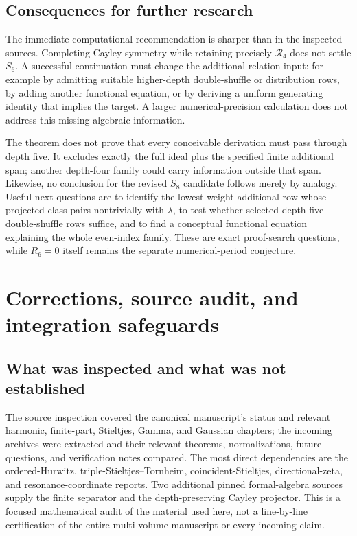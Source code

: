 \documentclass[11pt,a4paper]{article}
\numberwithin{equation}{section}
\theoremstyle{definition}
\theoremstyle{remark}
\begin{document}
\subsection{Consequences for further research}

The immediate computational recommendation is sharper than in the
inspected sources. Completing Cayley symmetry while retaining precisely
$\mathscr R_4$ does not settle $S_6$. A successful continuation must change
the additional relation input: for example by admitting suitable
higher-depth double-shuffle or distribution rows, by adding another
functional equation, or by deriving a uniform generating identity that
implies the target. A larger numerical-precision calculation does not
address this missing algebraic information.

The theorem does not prove that every conceivable derivation must pass
through depth five. It excludes exactly the full ideal plus the specified
finite additional span; another depth-four family could carry information
outside that span. Likewise, no conclusion for the revised $S_8$ candidate
follows merely by analogy. Useful next questions are to identify the
lowest-weight additional row whose projected class pairs nontrivially
with $\lambda$, to test whether selected depth-five double-shuffle rows
suffice, and to find a conceptual functional equation explaining the
whole even-index family. These are exact proof-search questions, while
$R_6=0$ itself remains the separate numerical-period conjecture.



\section{Corrections, source audit, and integration safeguards}
\label{audit:section}

\subsection{What was inspected and what was not established}

The source inspection covered the canonical manuscript's status and
relevant harmonic, finite-part, Stieltjes, Gamma, and Gaussian chapters;
the incoming archives were extracted and their relevant theorems,
normalizations, future questions, and verification notes compared.
The most direct dependencies are the ordered-Hurwitz,
triple-Stieltjes--Tornheim, coincident-Stieltjes, directional-zeta, and
resonance-coordinate reports. Two additional pinned formal-algebra
sources supply the finite separator and the depth-preserving Cayley
projector. This is a focused mathematical audit of the material used
here, not a line-by-line certification of the entire multi-volume
manuscript or every incoming claim.
\end{document}
